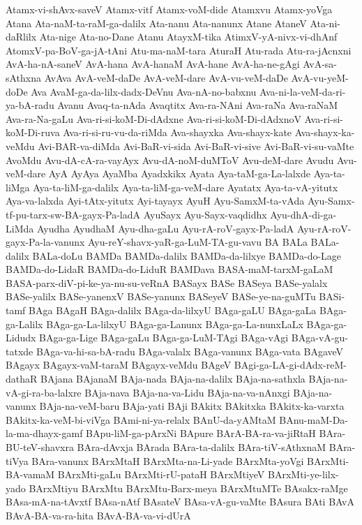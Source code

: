 {Atamx-vi-shAvx-saveV
Atamx-vitf
Atamx-voM-dide
Atamxvu
Atamx-yoVga
Atana
Ata-naM-ta-raM-ga-dalilx
Ata-nanu
Ata-nanunx
Atane
AtaneV
Ata-ni-daRlilx
Ata-nige
Ata-no-Dane
Atanu
AtayxM-tika
AtimxV-yA-nivx-vi-dhAnf
AtomxV-pa-BoV-ga-jA-tAni
Atu-ma-naM-tara
AturaH
Atu-rada
Atu-ra-jAcnxni
AvA-ha-nA-saneV
AvA-hana
AvA-hanaM
AvA-hane
AvA-ha-ne-gAgi
AvA-sa-sAthxna
AvAva
AvA-veM-daDe
AvA-veM-dare
AvA-vu-veM-daDe
AvA-vu-yeM-doDe
Ava
AvaM-ga-da-lilx-dadx-DeVnu
Ava-nA-no-babxnu
Ava-ni-la-veM-da-ri-ya-bA-radu
Avanu
Avaq-ta-nAda
Avaqtitx
Ava-ra-NAni
Ava-raNa
Ava-raNaM
Ava-ra-Na-gaLu
Ava-ri-si-koM-Di-dAdxne
Ava-ri-si-koM-Di-dAdxnoV
Ava-ri-si-koM-Di-ruva
Ava-ri-si-ru-vu-da-riMda
Ava-shayxka
Ava-shayx-kate
Ava-shayx-ka-veMdu
Avi-BAR-va-diMda
Avi-BaR-vi-sida
Avi-BaR-vi-sive
Avi-BaR-vi-su-vaMte
AvoMdu
Avu-dA-cA-ra-vayAyx
Avu-dA-noM-duMToV
Avu-deM-dare
Avudu
Avu-veM-dare
AyA
AyAya
AyaMba
Ayadxkikx
Ayata
Aya-taM-ga-La-lalxde
Aya-ta-liMga
Aya-ta-liM-ga-dalilx
Aya-ta-liM-ga-veM-dare
Ayatatx
Aya-ta-vA-yitutx
Aya-va-lalxda
Ayi-tAtx-yitutx
Ayi-tayayx
AyuH
Ayu-SamxM-ta-vAda
Ayu-Samx-tf-pu-tarx-sw-BA-gayx-Pa-ladA
AyuSayx
Ayu-Sayx-vaqdidhx
Ayu-dhA-di-ga-LiMda
Ayudha
AyudhaM
Ayu-dha-gaLu
Ayu-rA-roV-gayx-Pa-ladA
Ayu-rA-roV-gayx-Pa-la-vanunx
Ayu-reY-shavx-yaR-ga-LuM-TA-gu-vavu
BA
BALa
BALa-dalilx
BALa-doLu
BAMDa
BAMDa-dalilx
BAMDa-da-lilxye
BAMDa-do-Lage
BAMDa-do-LidaR
BAMDa-do-LiduR
BAMDava
BASA-maM-tarxM-gaLaM
BASA-parx-diV-pi-ke-ya-nu-su-veRnA
BASayx
BASe
BASeya
BASe-yalalx
BASe-yalilx
BASe-yanenxV
BASe-yanunx
BASeyeV
BASe-ye-na-guMTu
BASi-tamf
BAga
BAgaH
BAga-dalilx
BAga-da-lilxyU
BAga-gaLU
BAga-gaLa
BAga-ga-Lalilx
BAga-ga-La-lilxyU
BAga-ga-Lanunx
BAga-ga-La-nunxLaLx
BAga-ga-Lidudx
BAga-ga-Lige
BAga-gaLu
BAga-ga-LuM-TAgi
BAga-vAgi
BAga-vA-gu-tatxde
BAga-va-hi-sa-bA-radu
BAga-valalx
BAga-vanunx
BAga-vata
BAgaveV
BAgayx
BAgayx-vaM-taraM
BAgayx-veMdu
BAgeV
BAgi-ga-LA-gi-dAdx-reM-dathaR
BAjana
BAjanaM
BAja-nada
BAja-na-dalilx
BAja-na-sathxla
BAja-na-vA-gi-ra-ba-lalxre
BAja-nava
BAja-na-va-Lidu
BAja-na-va-nAnxgi
BAja-na-vanunx
BAja-na-veM-baru
BAja-yati
BAji
BAkitx
BAkitxka
BAkitx-ka-varxta
BAkitx-ka-veM-bi-viVga
BAmi-ni-ya-relalx
BAnU-da-yAMtaM
BAnu-maM-Da-la-ma-dhayx-gamf
BApu-liM-ga-pArxNi
BApure
BArA-BA-ra-va-jiRtaH
BAra-BU-teV-shavxra
BAra-dAvxja
BArada
BAra-ta-dalilx
BAra-tiV-sAthxnaM
BAra-tiVya
BAra-vanunx
BArxMtaH
BArxMta-na-Li-yade
BArxMta-yoVgi
BArxMti-BA-vamaM
BArxMti-gaLu
BArxMti-rU-pataH
BArxMtiyeV
BArxMti-ye-lilx-yado
BArxMtiyu
BArxMtu
BArxMtu-Barx-meya
BArxMtuMTe
BAsakx-raMge
BAsa-mA-na-tAvxtf
BAsa-nAtf
BAsateV
BAsa-vA-gu-vaMte
BAsura
BAti
BAvA
BAvA-BA-va-ra-hita
BAvA-BA-va-vi-dUrA
}
